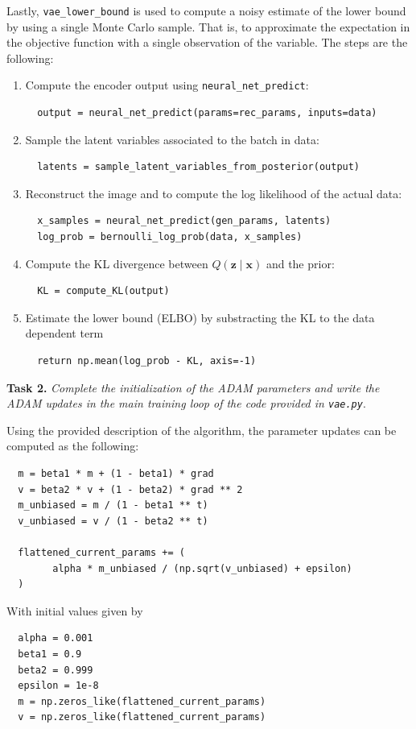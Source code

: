 \documentclass[11pt]{article}
\begin{document}
Lastly, \texttt{vae\_lower\_bound} is used to compute a noisy estimate of the lower bound by using a single Monte Carlo sample. That is, to approximate the expectation in the objective function with a single observation of the variable. The steps are the following:
\begin{enumerate}
  \item Compute the encoder output using \texttt{neural\_net\_predict}:
        \begin{verbatim}
  output = neural_net_predict(params=rec_params, inputs=data)
        \end{verbatim}
  \item Sample the latent variables associated to the batch in data:
        \begin{verbatim}
  latents = sample_latent_variables_from_posterior(output)
        \end{verbatim}
  \item Reconstruct the image and to compute the log likelihood of the actual data:
        \begin{verbatim}
  x_samples = neural_net_predict(gen_params, latents)
  log_prob = bernoulli_log_prob(data, x_samples)
        \end{verbatim}
  \item Compute the KL divergence between \( Q(\bm{z} \mid \bm{x}) \)  and the prior:
        \begin{verbatim}
  KL = compute_KL(output)
        \end{verbatim}
  \item Estimate the lower bound (ELBO) by substracting the KL to the data dependent term
        \begin{verbatim}
  return np.mean(log_prob - KL, axis=-1)
        \end{verbatim}
\end{enumerate}

\textbf{Task 2.} \emph{Complete the initialization of the ADAM parameters and write the ADAM updates
in the main training loop of the code provided in \texttt{vae.py}}.

Using the provided description of the algorithm, the parameter updates can be computed as the following:
\begin{verbatim}
  m = beta1 * m + (1 - beta1) * grad
  v = beta2 * v + (1 - beta2) * grad ** 2
  m_unbiased = m / (1 - beta1 ** t)
  v_unbiased = v / (1 - beta2 ** t)

  flattened_current_params += (
        alpha * m_unbiased / (np.sqrt(v_unbiased) + epsilon)
  )
\end{verbatim}
With initial values given by
\begin{verbatim}
  alpha = 0.001
  beta1 = 0.9
  beta2 = 0.999
  epsilon = 1e-8
  m = np.zeros_like(flattened_current_params)
  v = np.zeros_like(flattened_current_params)
\end{verbatim}
\end{document}
